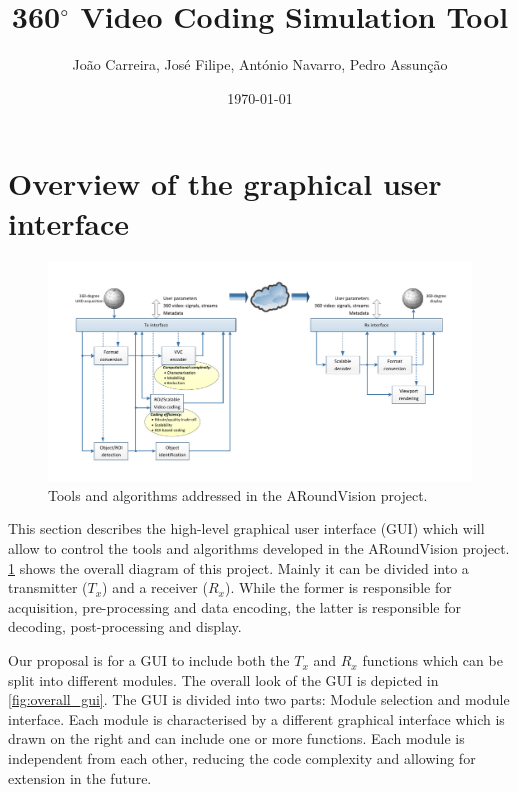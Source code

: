 \documentclass{article}
\title{\textbf{360$^\circ$ Video Coding} \textbf{Simulation Tool}}
\author{João Carreira, José Filipe, António Navarro, Pedro Assunção}
\date{\today}
\begin{document}
\maketitle
\tableofcontents

\section{Overview of the graphical user interface}

\begin{figure}[ht]
    \centering
    \includegraphics[width=1\textwidth]{ARoundVision_Framework_Diagram_v2.pdf}
    \caption{Tools and algorithms addressed in the ARoundVision project.}
    \label{fig:scheme}
\end{figure}

This section describes the high-level graphical user interface (GUI) which will allow to control the tools and algorithms developed in the ARoundVision project. \cref{fig:scheme} shows the overall diagram of this project. Mainly it can be divided into a transmitter ($T_x$) and a receiver ($R_x$). While the former is responsible for acquisition, pre-processing and data encoding, the latter is responsible for decoding, post-processing and display.

Our proposal is for a GUI to include both the $T_x$ and $R_x$ functions which can be split into different modules. The overall look of the GUI is depicted in \cref{fig:overall_gui}. The GUI is divided into two parts: Module selection and module interface. Each module is characterised by a different graphical interface which is drawn on the right and can include one or more functions. Each module is independent from each other, reducing the code complexity and allowing for extension in the future.
\end{document}
